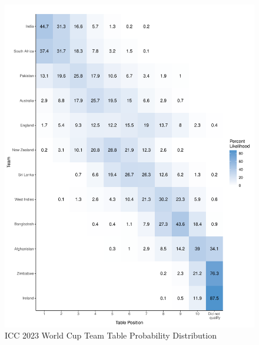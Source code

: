 \documentclass[paper=a4, 12pt, twoside]{article}
\begin{document}
 \begin{figure}[h]
	\centering
	\includegraphics[scale=0.60]{cricket_plot.pdf} 
	\caption{ICC 2023 World Cup Team Table Probability Distribution}
	\label{joshplot}
\end{figure}
\end{document}
